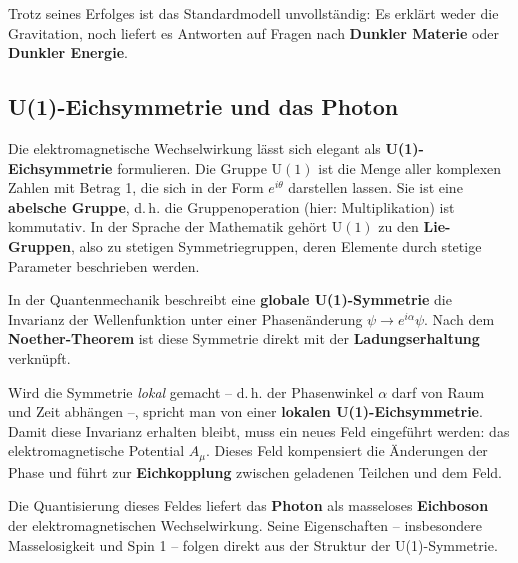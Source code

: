 Trotz seines Erfolges ist das Standardmodell unvollständig:  
Es erklärt weder die Gravitation, noch liefert es Antworten auf Fragen nach \textbf{Dunkler Materie} oder \textbf{Dunkler Energie}.

\subsection{U(1)-Eichsymmetrie und das Photon}



Die elektromagnetische Wechselwirkung lässt sich elegant als \textbf{U(1)-Eich\-symmetrie} formulieren.  
Die Gruppe \(\mathrm{U(1)}\) ist die Menge aller komplexen Zahlen mit Betrag 1, die sich in der Form \(e^{i\theta}\) darstellen lassen.  
Sie ist eine \textbf{abelsche Gruppe}, d.\,h. die Gruppenoperation (hier: Multiplikation) ist kommutativ.  
In der Sprache der Mathematik gehört \(\mathrm{U(1)}\) zu den \textbf{Lie-Gruppen}, also zu stetigen Symmetriegruppen, deren Elemente durch stetige Parameter beschrieben werden.

In der Quantenmechanik beschreibt eine \textbf{globale U(1)-Symmetrie} die Invarianz der Wellenfunktion unter einer Phasenänderung \(\psi \to e^{i\alpha}\psi\).  
Nach dem \textbf{Noether-Theorem} ist diese Symmetrie direkt mit der \textbf{Ladungserhaltung} verknüpft.

Wird die Symmetrie \emph{lokal} gemacht – d.\,h. der Phasenwinkel \(\alpha\) darf von Raum und Zeit abhängen –, spricht man von einer \textbf{lokalen U(1)-Eichsymmetrie}.  
Damit diese Invarianz erhalten bleibt, muss ein neues Feld eingeführt werden: das elektromagnetische Potential \(A_\mu\).  
Dieses Feld kompensiert die Änderungen der Phase und führt zur \textbf{Eichkopplung} zwischen geladenen Teilchen und dem Feld.

Die Quantisierung dieses Feldes liefert das \textbf{Photon} als masseloses \textbf{Eichboson} der elektromagnetischen Wechselwirkung.  
Seine Eigenschaften – insbesondere Masselosigkeit und Spin 1 – folgen direkt aus der Struktur der U(1)-Symmetrie.

